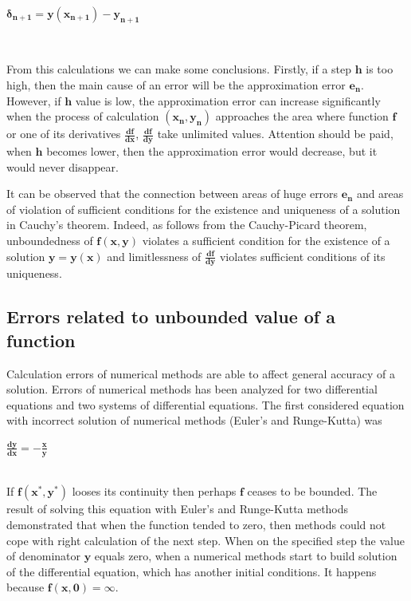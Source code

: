 \documentclass{article}
\begin{document}
\begin{myequation}
    \centerline{$\boldsymbol{\delta_{n+1}} \boldsymbol{=} \boldsymbol{y (x_{n+1}) - y_{n+1}}$}
\end{myequation}
\\
\par From this calculations we can make some conclusions. Firstly, if a step $\boldsymbol{h}$ is too high, then the main cause of an error will be the approximation error $\boldsymbol{e_n}$. However, if $\boldsymbol{h}$ value is low, the approximation error can increase significantly when the process of calculation $\boldsymbol{(x_n , y_n)}$ approaches the area where function $\boldsymbol{f}$ or one of its derivatives $\boldsymbol{\frac{df}{dx}}$, $\boldsymbol{\frac{df}{dy}}$ take unlimited values. Attention should be paid, when $\boldsymbol{h}$ becomes lower, then the approximation error would decrease, but it would never disappear. 
\par It can be observed that the connection between areas of huge errors $\boldsymbol{e_n}$ and areas of violation of sufficient conditions for the existence and uniqueness of a solution in Cauchy's theorem. Indeed, as follows from the Cauchy-Picard theorem, unboundedness of $\boldsymbol{f(x,y)}$ violates a sufficient condition for the existence of a solution $\boldsymbol{y = y(x)}$ and limitlessness of $\boldsymbol{\frac{df}{dy}}$ violates sufficient conditions of its uniqueness.


\subsection{Errors related to unbounded value of a function}
\par Calculation errors of numerical methods are able to affect general accuracy of a solution. Errors of numerical methods has been analyzed for two differential equations and two systems of differential equations.
The first considered equation with incorrect solution of numerical methods (Euler's and Runge-Kutta) was \\
\begin{myequation}
\centerline{$\boldsymbol{\frac{dy}{dx} = - \frac{x}{y}}$}
\end{myequation} \\
If $\boldsymbol{f(x^*, y^*)}$  looses its continuity then perhaps $\boldsymbol{f}$ ceases to be bounded.
The result of solving this equation with Euler's and Runge-Kutta methods demonstrated that when the function tended to zero, then methods could not cope with right calculation of the next step. 
When on the specified step the value of denominator $\boldsymbol{y}$ equals zero, when a numerical methods start to build solution of the differential equation, which has another initial conditions. It happens because  $\boldsymbol{f(x, 0) = \infty}$. 
\end{document}
